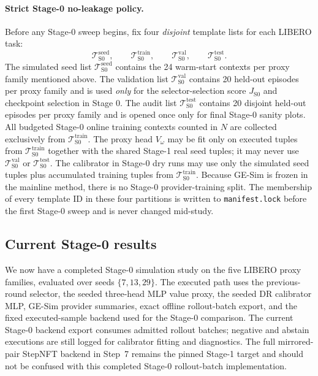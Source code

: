 \documentclass[10pt]{article}
\theoremstyle{plain}
\theoremstyle{definition}
\theoremstyle{remark}
\begin{document}
\paragraph{Strict Stage-0 no-leakage policy.}
Before any Stage-0 sweep begins, fix four \emph{disjoint} template lists for each LIBERO task:
\[
\mathcal T^{\mathrm{seed}}_{\mathrm{S0}},\qquad
\mathcal T^{\mathrm{train}}_{\mathrm{S0}},\qquad
\mathcal T^{\mathrm{val}}_{\mathrm{S0}},\qquad
\mathcal T^{\mathrm{test}}_{\mathrm{S0}}.
\]
The simulated seed list $\mathcal T^{\mathrm{seed}}_{\mathrm{S0}}$ contains the 24 warm-start contexts per proxy family mentioned above. The validation list $\mathcal T^{\mathrm{val}}_{\mathrm{S0}}$ contains 20 held-out episodes per proxy family and is used \emph{only} for the selector-selection score $J_{\mathrm{S0}}$ and checkpoint selection in Stage 0. The audit list $\mathcal T^{\mathrm{test}}_{\mathrm{S0}}$ contains 20 disjoint held-out episodes per proxy family and is opened once only for final Stage-0 sanity plots. All budgeted Stage-0 online training contexts counted in $N$ are collected exclusively from $\mathcal T^{\mathrm{train}}_{\mathrm{S0}}$. The proxy head $V_{\omega}$ may be fit only on executed tuples from $\mathcal T^{\mathrm{train}}_{\mathrm{S0}}$ together with the shared Stage-1 real seed tuples; it may never use $\mathcal T^{\mathrm{val}}_{\mathrm{S0}}$ or $\mathcal T^{\mathrm{test}}_{\mathrm{S0}}$. The calibrator in Stage-0 dry runs may use only the simulated seed tuples plus accumulated training tuples from $\mathcal T^{\mathrm{train}}_{\mathrm{S0}}$. Because GE-Sim is frozen in the mainline method, there is no Stage-0 provider-training split. The membership of every template ID in these four partitions is written to \texttt{manifest.lock} before the first Stage-0 sweep and is never changed mid-study.

\subsection{Current Stage-0 results}
We now have a completed Stage-0 simulation study on the five LIBERO proxy families, evaluated over seeds $\{7,13,29\}$. The executed path uses the previous-round selector, the seeded three-head MLP value proxy, the seeded DR calibrator MLP, GE-Sim provider summaries, exact offline rollout-batch export, and the fixed executed-sample backend used for the Stage-0 comparison. The current Stage-0 backend export consumes admitted rollout batches; negative and abstain executions are still logged for calibrator fitting and diagnostics. The full mirrored-pair StepNFT backend in Step~7 remains the pinned Stage-1 target and should not be confused with this completed Stage-0 rollout-batch implementation.
\end{document}
